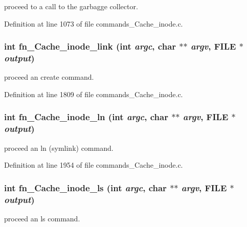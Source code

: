 proceed to a call to the garbagge collector. 

Definition at line 1073 of file commands\_\-Cache\_\-inode.c.
\subsubsection[{fn\_\-Cache\_\-inode\_\-link}]{\setlength{\rightskip}{0pt plus 5cm}int fn\_\-Cache\_\-inode\_\-link (int {\em argc}, \/  char $\ast$$\ast$ {\em argv}, \/  FILE $\ast$ {\em output})}\label{commands__Cache__inode_8c_29e45dc95b214393d1c59b7816f9e72d}


proceed an create command. 

Definition at line 1809 of file commands\_\-Cache\_\-inode.c.
\subsubsection[{fn\_\-Cache\_\-inode\_\-ln}]{\setlength{\rightskip}{0pt plus 5cm}int fn\_\-Cache\_\-inode\_\-ln (int {\em argc}, \/  char $\ast$$\ast$ {\em argv}, \/  FILE $\ast$ {\em output})}\label{commands__Cache__inode_8c_da1665ad0f6c599f444cecdfe3781260}


proceed an ln (symlink) command. 

Definition at line 1954 of file commands\_\-Cache\_\-inode.c.
\subsubsection[{fn\_\-Cache\_\-inode\_\-ls}]{\setlength{\rightskip}{0pt plus 5cm}int fn\_\-Cache\_\-inode\_\-ls (int {\em argc}, \/  char $\ast$$\ast$ {\em argv}, \/  FILE $\ast$ {\em output})}\label{commands__Cache__inode_8c_2ba98a95ea4426bf580d55f4dacab3b7}


proceed an ls command. 

